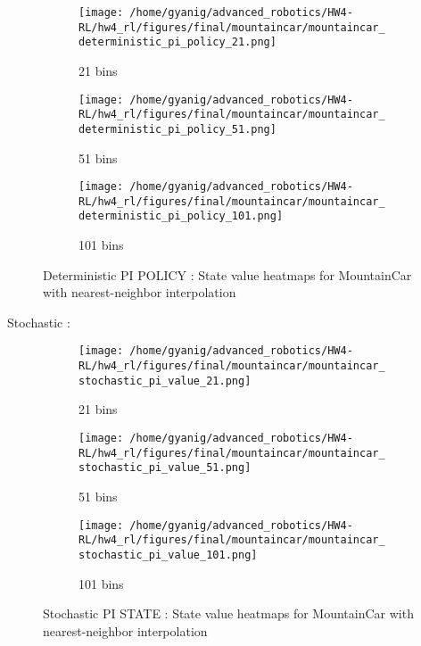 \documentclass{article}
\begin{document}
\begin{figure}[h]
    \centering
    \begin{subfigure}{0.32\textwidth}
        \texttt{[image: /home/gyanig/advanced\_robotics/HW4-RL/hw4\_rl/figures/final/mountaincar/mountaincar\_deterministic\_pi\_policy\_21.png]}
        \caption{21 bins}
    \end{subfigure}
    \begin{subfigure}{0.32\textwidth}
        \texttt{[image: /home/gyanig/advanced\_robotics/HW4-RL/hw4\_rl/figures/final/mountaincar/mountaincar\_deterministic\_pi\_policy\_51.png]}
        \caption{51 bins}
    \end{subfigure}
    \begin{subfigure}{0.32\textwidth}
        \texttt{[image: /home/gyanig/advanced\_robotics/HW4-RL/hw4\_rl/figures/final/mountaincar/mountaincar\_deterministic\_pi\_policy\_101.png]}
        \caption{101 bins}
    \end{subfigure}
    \caption{Deterministic PI POLICY : State value heatmaps for MountainCar with nearest-neighbor interpolation}
\end{figure}

Stochastic :

\begin{figure}[h]
    \centering
    \begin{subfigure}{0.32\textwidth}
        \texttt{[image: /home/gyanig/advanced\_robotics/HW4-RL/hw4\_rl/figures/final/mountaincar/mountaincar\_stochastic\_pi\_value\_21.png]}
        \caption{21 bins}
    \end{subfigure}
    \begin{subfigure}{0.32\textwidth}
        \texttt{[image: /home/gyanig/advanced\_robotics/HW4-RL/hw4\_rl/figures/final/mountaincar/mountaincar\_stochastic\_pi\_value\_51.png]}
        \caption{51 bins}
    \end{subfigure}
    \begin{subfigure}{0.32\textwidth}
        \texttt{[image: /home/gyanig/advanced\_robotics/HW4-RL/hw4\_rl/figures/final/mountaincar/mountaincar\_stochastic\_pi\_value\_101.png]}
        \caption{101 bins}
    \end{subfigure}
    \caption{Stochastic PI STATE : State value heatmaps for MountainCar with nearest-neighbor interpolation}
\end{figure}
\end{document}
